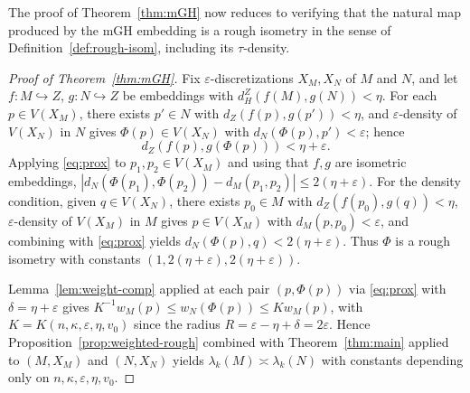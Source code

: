 \documentclass[10pt,reqno]{amsart}
\theoremstyle{remark}
\begin{document}
The proof of Theorem~\ref{thm:mGH} now reduces to verifying that
the natural map produced by the mGH embedding is a rough isometry
in the sense of Definition~\ref{def:rough-isom}, including its
$\tau$-density.
\begin{proof}[Proof of Theorem~\ref{thm:mGH}]
Fix $\varepsilon$-discretizations $X_M, X_N$ of $M$ and $N$, and let
$f : M \hookrightarrow Z$, $g : N \hookrightarrow Z$ be embeddings
with $d_H^Z(f(M), g(N)) < \eta$. For
each $p \in V(X_M)$, there exists
$p' \in N$ with $d_Z(f(p), g(p')) < \eta$, and $\varepsilon$-density
of $V(X_N)$ in $N$ gives $\Phi(p) \in V(X_N)$ with
$d_N(\Phi(p), p') < \varepsilon$; hence
\begin{equation}
\label{eq:prox}
  d_Z(f(p), g(\Phi(p))) < \eta + \varepsilon.
\end{equation}
Applying \eqref{eq:prox} to $p_1, p_2 \in V(X_M)$ and using that
$f, g$ are isometric embeddings,
$|d_N(\Phi(p_1), \Phi(p_2)) - d_M(p_1, p_2)| \le 2(\eta + \varepsilon)$.
For the density condition, given $q \in V(X_N)$, there exists $p_0 \in M$ with $d_Z(f(p_0), g(q)) < \eta$,
$\varepsilon$-density of $V(X_M)$ in $M$ gives $p \in V(X_M)$
with $d_M(p, p_0) < \varepsilon$, and combining with \eqref{eq:prox}
yields $d_N(\Phi(p), q) < 2(\eta + \varepsilon)$. Thus $\Phi$ is a
rough isometry with
constants $(1, 2(\eta + \varepsilon), 2(\eta + \varepsilon))$.

Lemma~\ref{lem:weight-comp} applied at each pair $(p, \Phi(p))$
via \eqref{eq:prox} with $\delta = \eta + \varepsilon$
gives $K^{-1} w_M(p) \le w_N(\Phi(p)) \le K w_M(p)$, with
$K = K(n, \kappa, \varepsilon, \eta, v_0)$ since the radius
$R = \varepsilon - \eta + \delta = 2\varepsilon$. Hence Proposition~\ref{prop:weighted-rough} combined with
  Theorem~\ref{thm:main} applied to $(M, X_M)$ and $(N, X_N)$
  yields $\lambda_k(M) \asymp \lambda_k(N)$ with constants
  depending only on $n, \kappa, \varepsilon, \eta, v_0$.
\end{proof}
\end{document}

